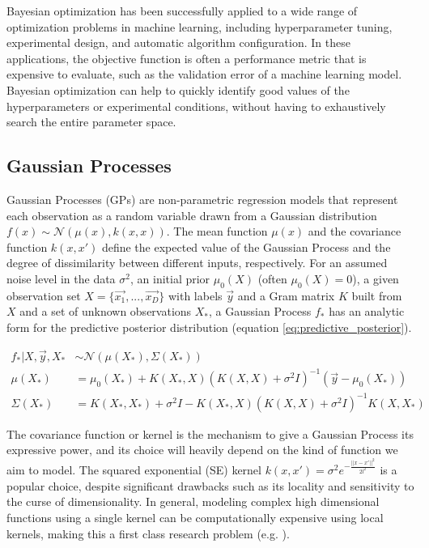 \documentclass[sn-mathphys,Numbered]{sn-jnl}%
\begin{document}
Bayesian optimization has been successfully applied to a wide range of optimization problems in machine learning, including hyperparameter tuning, experimental design, and automatic algorithm configuration. In these applications, the objective function is often a performance metric that is expensive to evaluate, such as the validation error of a machine learning model. Bayesian optimization can help to quickly identify good values of the hyperparameters or experimental conditions, without having to exhaustively search the entire parameter space.

\subsection{Gaussian Processes}
Gaussian Processes (GPs) are non-parametric regression models that represent each observation as a random variable drawn from a Gaussian distribution $f(x) \sim \mathcal{N}(\mu(x), k(x,x))$\cite{gaussian-processes}. The mean function $\mu(x)$ and the covariance function $k(x,x')$ define the expected value of the Gaussian Process and the degree of dissimilarity between different inputs, respectively. For an assumed noise level in the data $\sigma^2$, an initial prior $\mu_0(X)$ (often $\mu_0(X)=0$), a given observation set $X=\{\vec{x_1}, ..., \vec{x_D}\}$ with labels $\vec{y}$ and a Gram matrix $K$ built from $X$ and a set of unknown observations $X_*$, a Gaussian Process $f_*$ has an analytic form for the predictive posterior distribution (equation \ref{eq:predictive_posterior}).

\begin{equation} \label{eq:predictive_posterior}
	\begin{aligned}
		f_*|X,\vec{y},X_* & \sim \mathcal{N}(\mu(X_*), \Sigma(X_*)) \\
		\mu(X_*) & = \mu_0(X_*) + K(X_*,X)(K(X,X) + \sigma^2 I)^{-1}(\vec{y} - \mu_0(X_*)) \\
		\Sigma(X_*) & = K(X_*,X_*) + \sigma^2 I - K(X_*,X)(K(X,X) + \sigma^2 I)^{-1} K(X,X_*)
	\end{aligned}
\end{equation}	

The covariance function or kernel is the mechanism to give a Gaussian Process its expressive power, and its choice will heavily depend on the kind of function we aim to model\cite{kernel-composition}. The squared exponential (SE) kernel $k(x,x') = \sigma^2 e^{-\frac{||x-x'||^2}{2l^2}}$ is a popular choice, despite significant drawbacks such as its locality and sensitivity to the curse of dimensionality\cite{curse-dimensionality}.
In general, modeling complex high dimensional functions using a single kernel can be computationally expensive using local kernels, making this a first class research problem (e.g. \cite{gp-high-dim}\cite{gp-high-dim2}).
\end{document}
